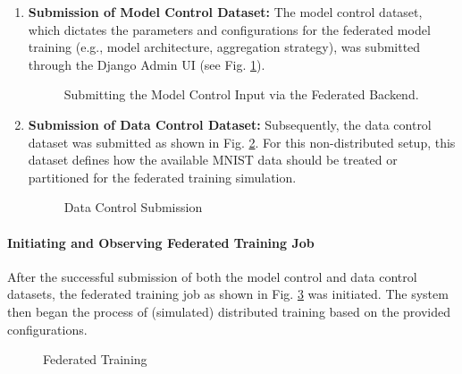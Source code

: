 \begin{enumerate}
    \item \textbf{Submission of Model Control Dataset:} The model control dataset, which dictates the parameters and configurations for the federated model training (e.g., model architecture, aggregation strategy), was submitted through the Django Admin UI (see Fig. \ref{fig:model_control_submission}).
    \begin{figure}[h!]
        \centering
        \caption{Submitting the Model Control Input via the Federated Backend.}
        \label{fig:model_control_submission}
    \end{figure}

    \item \textbf{Submission of Data Control Dataset:} Subsequently, the data control dataset was submitted as shown in Fig. \ref{fig:data_control_submission}. For this non-distributed setup, this dataset defines how the available MNIST data should be treated or partitioned for the federated training simulation.
    \begin{figure}[h!]
        \centering
        \caption{Data Control Submission}
        \label{fig:data_control_submission}
    \end{figure}
\end{enumerate}

\paragraph{Initiating and Observing Federated Training Job}
After the successful submission of both the model control and data control datasets, the federated training job as shown in Fig. \ref{fig:federated_training_job} was initiated. The system then began the process of (simulated) distributed training based on the provided configurations.
\begin{figure}[h!]
    \centering
    \caption{Federated Training}
    \label{fig:federated_training_job}
\end{figure}

